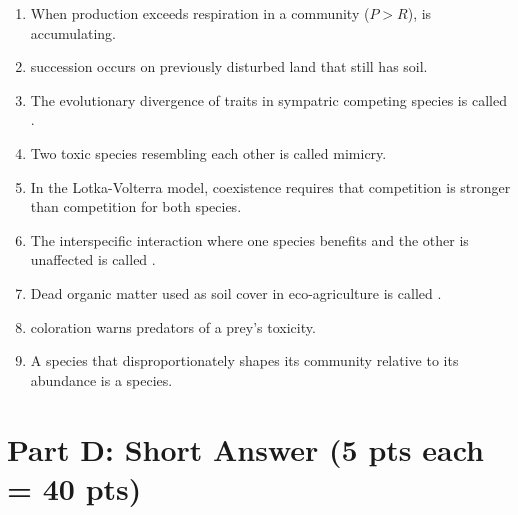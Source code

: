\documentclass[11pt]{article}
\begin{document}
\begin{enumerate}[label=\textbf{\arabic*.}]
  \item When production exceeds respiration in a community ($P > R$), \underline{\hspace{3cm}} is accumulating.
  \item \underline{\hspace{3cm}} succession occurs on previously disturbed land that still has soil.
  \item The evolutionary divergence of traits in sympatric competing species is called \underline{\hspace{3cm}}.
  \item Two toxic species resembling each other is called \underline{\hspace{3cm}} mimicry.
  \item In the Lotka-Volterra model, coexistence requires that \underline{\hspace{2.5cm}} competition is stronger than \underline{\hspace{2.5cm}} competition for both species.
  \item The interspecific interaction where one species benefits and the other is unaffected is called \underline{\hspace{3cm}}.
  \item Dead organic matter used as soil cover in eco-agriculture is called \underline{\hspace{3cm}}.
  \item \underline{\hspace{3cm}} coloration warns predators of a prey's toxicity.
  \item A species that disproportionately shapes its community relative to its abundance is a \underline{\hspace{3cm}} species.
\end{enumerate}

\clearpage

\section*{Part D: Short Answer (5 pts each = 40 pts)}
\end{document}
